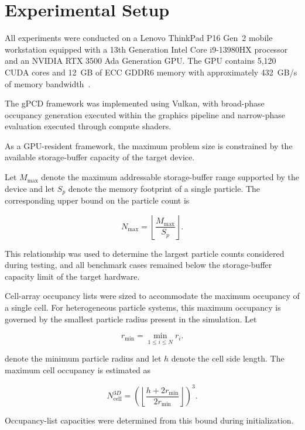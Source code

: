 \section{Experimental Setup}

All experiments were conducted on a Lenovo ThinkPad P16 Gen~2 mobile
workstation equipped with a 13th Generation Intel Core i9-13980HX
processor and an NVIDIA RTX 3500 Ada Generation GPU. The GPU contains
5,120 CUDA cores and 12~GB of ECC GDDR6 memory with approximately
432~GB/s of memory bandwidth~\cite{hinumNVIDIARTX3500}.

The gPCD framework was implemented using Vulkan, with broad-phase
occupancy generation executed within the graphics pipeline and
narrow-phase evaluation executed through compute shaders. 

As a GPU-resident framework, the maximum problem size is constrained by the available storage-buffer capacity of the target device.

Let \(M_{\max}\) denote the maximum addressable storage-buffer range
supported by the device and let $S_p$ denote the memory footprint of
a single particle. The corresponding upper bound on the particle count
is


\begin{equation}
N_{\max}=\left\lfloor\frac{M_{\max}}{S_p}\right\rfloor.
\end{equation}

This relationship was used to determine the largest particle counts
considered during testing, and all benchmark cases remained below the
storage-buffer capacity limit of the target hardware.

Cell-array occupancy lists were sized to accommodate the maximum
occupancy of a single cell. For heterogeneous particle systems, 
this maximum occupancy is governed by the smallest
particle radius present in the simulation. Let

\begin{equation}
r_{\min}=\min_{1\le i\le N} r_i.
\end{equation}

denote the minimum particle radius and let \(h\) denote the cell side
length. The maximum cell occupancy is estimated as

\begin{equation}
N_{\mathrm{cell}}^{3D}=\left(\left\lfloor\frac{h+2r_{\min}}{2r_{\min}}\right\rfloor\right)^3.
\end{equation}

Occupancy-list capacities were determined from this bound during
initialization.


